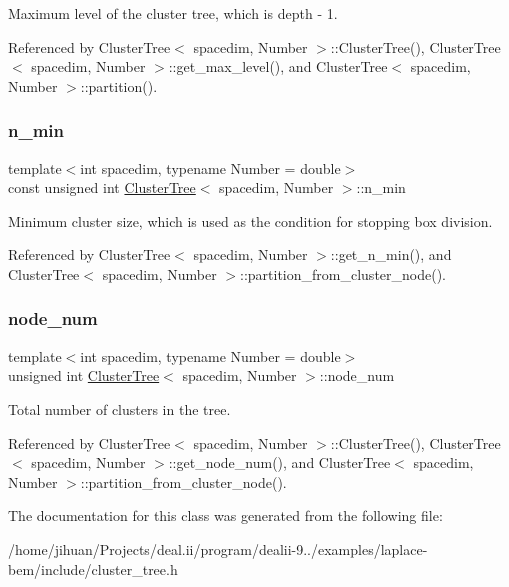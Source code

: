 Maximum level of the cluster tree, which is {\ttfamily depth} -\/ 1. 

Referenced by Cluster\+Tree$<$ spacedim, Number $>$\+::\+Cluster\+Tree(), Cluster\+Tree$<$ spacedim, Number $>$\+::get\+\_\+max\+\_\+level(), and Cluster\+Tree$<$ spacedim, Number $>$\+::partition().

\mbox{\label{classClusterTree_a2c1aa1755a2c06056b4d6b32ec35dba5}} 
\subsubsection{\texorpdfstring{n\+\_\+min}{n\_min}}
{\footnotesize\ttfamily template$<$int spacedim, typename Number = double$>$ \\
const unsigned int \hyperlink{classClusterTree}{Cluster\+Tree}$<$ spacedim, Number $>$\+::n\+\_\+min\hspace{0.3cm}{\ttfamily [private]}}

Minimum cluster size, which is used as the condition for stopping box division. 

Referenced by Cluster\+Tree$<$ spacedim, Number $>$\+::get\+\_\+n\+\_\+min(), and Cluster\+Tree$<$ spacedim, Number $>$\+::partition\+\_\+from\+\_\+cluster\+\_\+node().

\mbox{\label{classClusterTree_a6b352489be3ca9217d31966c24ee02a1}} 
\subsubsection{\texorpdfstring{node\+\_\+num}{node\_num}}
{\footnotesize\ttfamily template$<$int spacedim, typename Number = double$>$ \\
unsigned int \hyperlink{classClusterTree}{Cluster\+Tree}$<$ spacedim, Number $>$\+::node\+\_\+num\hspace{0.3cm}{\ttfamily [private]}}

Total number of clusters in the tree. 

Referenced by Cluster\+Tree$<$ spacedim, Number $>$\+::\+Cluster\+Tree(), Cluster\+Tree$<$ spacedim, Number $>$\+::get\+\_\+node\+\_\+num(), and Cluster\+Tree$<$ spacedim, Number $>$\+::partition\+\_\+from\+\_\+cluster\+\_\+node().



The documentation for this class was generated from the following file\+:\begin{DoxyCompactItemize}
\item 
/home/jihuan/\+Projects/deal.\+ii/program/dealii-\/9../examples/laplace-\/bem/include/cluster\+\_\+tree.\+h\end{DoxyCompactItemize}
